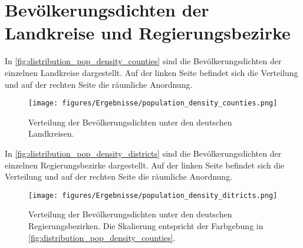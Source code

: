 \section{Bevölkerungsdichten der Landkreise und Regierungsbezirke}
In \autoref{fig:distribution_pop_density_counties} sind die Bevölkerungsdichten der einzelnen Landkreise dargestellt. Auf der linken Seite befindet sich die Verteilung und auf der rechten Seite die räumliche Anordnung.

\begin{figure}[H]
    \centering
    \texttt{[image: figures/Ergebnisse/population\_density\_counties.png]}
    \caption{Verteilung der Bevölkerungsdichten unter den deutschen Landkreisen.}
    \label{fig:distribution_pop_density_counties}
\end{figure}

In \autoref{fig:distribution_pop_density_districts} sind die Bevölkerungsdichten der einzelnen Regierungsbezirke dargestellt. Auf der linken Seite befindet sich die Verteilung und auf der rechten Seite die räumliche Anordnung.

\begin{figure}[H]
    \centering
    \texttt{[image: figures/Ergebnisse/population\_density\_ditricts.png]}
    \caption{Verteilung der Bevölkerungsdichten unter den deutschen Regierungsbezirken. Die Skalierung entspricht der Farbgebung in \autoref{fig:distribution_pop_density_counties}.}
    \label{fig:distribution_pop_density_districts}
\end{figure}